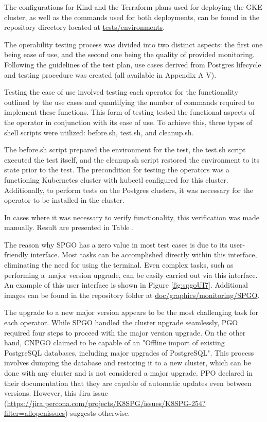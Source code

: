 The configurations for Kind and the Terraform plans used for deploying the GKE cluster, as well as the commands used for both deployments, can be found in the repository directory located at \url{tests/environments}.

\label{chap:operability}

The operability testing process was divided into two distinct aspects: the first one
being ease of use, and the second one being the quality of provided monitoring.
Following the guidelines of the test plan, use cases derived from Postgres lifecycle and testing procedure was created (all available in Appendix A V).

\label{chap:easeOfUse}
Testing the ease of use involved testing each operator for the functionality outlined by the use cases and quantifying the number of commands required to implement these functions.
This form of testing tested the functional aspects of the operator in conjunction with its ease of use.
To achieve this, three types of shell scripts were utilized: before.sh, test.sh, and cleanup.sh.

The before.sh script prepared the environment for the test, the test.sh script executed the test itself, and the cleanup.sh script restored the environment to its state prior to the test.
The precondition for testing the operators was a functioning Kubernetes cluster with kubectl configured for this cluster.
Additionally, to perform tests on the Postgres clusters, it was necessary for the operator to be installed in the cluster.

In cases where it was necessary to verify functionality, this verification was made manually. Result are presented in Table .

The reason why SPGO has a zero value in most test cases is due to its user-friendly interface.
Most tasks can be accomplished directly within this interface, eliminating the need for using the terminal.
Even complex tasks, such as performing a major version upgrade, can be easily carried out via this interface.
An example of this user interface is shown in Figure \ref{fig:spgoUI7}.
Additional images can be found in the repository folder at \url{doc/graphics/monitoring/SPGO}.


The upgrade to a new major version appears to be the most challenging task for each operator. While SPGO handled the cluster upgrade seamlessly, PGO required four steps to proceed with the major version upgrade. On the other hand, CNPGO claimed to be capable of an "Offline import of existing PostgreSQL databases, including major upgrades of PostgreSQL". This process involves dumping the database and restoring it to a new cluster, which can be done with any cluster and is not considered a major upgrade. PPO declared in their documentation that they are capable of automatic updates even between versions. However, this Jira issue (\url{https://jira.percona.com/projects/K8SPG/issues/K8SPG-254?filter=allopenissues}) suggests otherwise.

